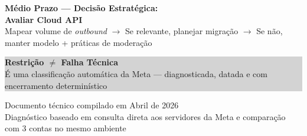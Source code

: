 \documentclass[12pt, a4paper]{article}
\begin{document}
\begin{center}
\begin{flushleft}
    \vspace{1cm}

    \textbf{Médio Prazo --- Decisão Estratégica:} \\
    \vspace{0.3cm}
    \hspace{1cm} \textcolor{accentColor}{\Large \textbf{Avaliar Cloud API}} \\
    \hspace{1cm} \textcolor{secondaryText}{Mapear volume de \textit{outbound} $\rightarrow$ Se relevante, planejar migração $\rightarrow$ Se não, manter modelo + práticas de moderação} \\
    \end{flushleft}

    \vspace{0.5cm}

    \colorbox{lightGray}{%
        \parbox{0.9\textwidth}{%
            \centering
            \vspace{0.4cm}
            \textcolor{primaryColor}{\large \textbf{Restrição $\neq$ Falha Técnica}} \\
            \vspace{0.2cm}
            \textcolor{secondaryText}{\normalsize É uma classificação automática da Meta --- diagnosticada, datada e com encerramento determinístico} \\
            \vspace{0.4cm}
        }%
    }

    \vfill

    \textcolor{secondaryText}{\footnotesize Documento técnico compilado em Abril de 2026} \\
    \textcolor{secondaryText}{\footnotesize Diagnóstico baseado em consulta direta aos servidores da Meta e comparação com 3 contas no mesmo ambiente}

\end{center}
\end{document}
